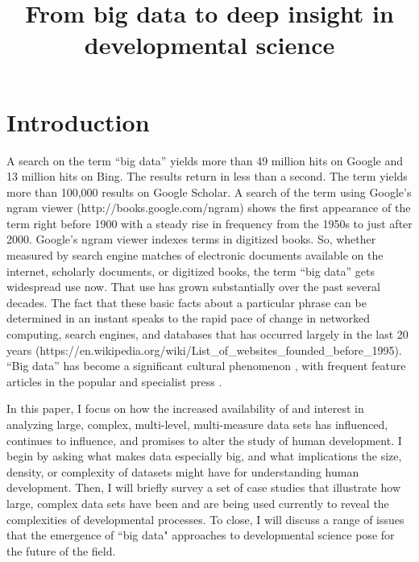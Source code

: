 \documentclass[letterpaper,man,apacite]{apa6}
\title{From big data to deep insight in developmental science}
\begin{document}
\maketitle

\section{Introduction}

A search on the term ``big data'' yields more than 49 million hits on Google and 13 million hits on Bing.
The results return in less than a second.
The term yields more than 100,000 results on Google Scholar.
A search of the term using Google's ngram viewer (http://books.google.com/ngram) shows the first appearance of the term right before 1900 with a steady rise in frequency from the 1950s to just after 2000.
Google's ngram viewer indexes terms in digitized books.
So, whether measured by search engine matches of electronic documents available on the internet, scholarly documents, or digitized books, the term ``big data'' gets widespread use now.
That use has grown substantially over the past several decades.
The fact that these basic facts about a particular phrase can be determined in an instant speaks to the rapid pace of change in networked computing, search engines, and databases that has occurred largely in the last 20 years (https://en.wikipedia.org/wiki/List_of_websites_founded_before_1995).
``Big data'' has become a significant cultural phenomenon \cite{borgman_big_2015; boyd_critical_2012}, with frequent feature articles in the popular \cite{lohr_big_2012, Marcus2013} and specialist press \cite{HBR2015, Press2013a}.

In this paper, I focus on how the increased availability of and interest in analyzing large, complex, multi-level, multi-measure data sets has influenced, continues to influence, and promises to alter the study of human development.
I begin by asking what makes data especially big, and what implications the size, density, or complexity of datasets might have for understanding human development.
Then, I will briefly survey a set of case studies that illustrate how large, complex data sets have been and are being used currently to reveal the complexities of developmental processes.
To close, I will discuss a range of issues that the emergence of ``big data" approaches to developmental science pose for the future of the field.
\end{document}
